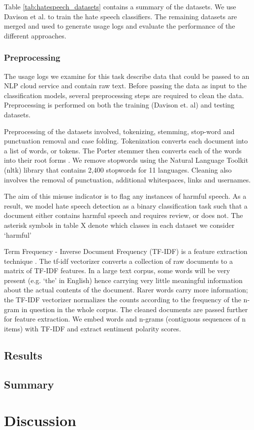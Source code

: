 \documentclass[a4paper,12pt]{report}
\begin{document}
	Table \ref{tab:hatespeech_datasets} contains a summary of the datasets. We use Davison et al. to train the hate speech classifiers. The remaining datasets are merged and used to generate usage logs and evaluate the performance of the different approaches.
	
	\subsection{Preprocessing}
	The usage logs we examine for this task describe data that could be passed to an NLP cloud service and contain raw text. Before passing the data as input to the classification models, several preprocessing steps are required to clean the data. Preprocessing is performed on both the training (Davison et. al) and testing datasets.
	
	Preprocessing of the datasets involved, tokenizing, stemming, stop-word and punctuation removal and case folding. Tokenization converts each document into a list of words, or tokens. The Porter stemmer then converts each of the words into their root forms \cite{porter1997readings}. We remove stopwords using the Natural Language Toolkit (nltk) library that contains 2,400 stopwords for 11 languages. Cleaning also involves the removal of punctuation, additional whitespaces, links and usernames.
	
	The aim of this misuse indicator is to flag any instances of harmful speech. As a result, we model hate speech detection as a binary classification task such that a document either contains harmful speech and requires review, or does not. The asterisk symbols in table X denote which classes in each dataset we consider `harmful’
	
	Term Frequency - Inverse Document Frequency (TF-IDF) is a feature extraction technique \cite{ramos2003using}. The tf-idf vectorizer converts a collection of raw documents to a matrix of TF-IDF features. In a large text corpus, some words will be very present (e.g. `the’ in English) hence carrying very little meaningful information about the actual contents of the document. Rarer words carry more information; the TF-IDF vectorizer normalizes the counts according to the frequency of the n-gram in question in the whole corpus. The cleaned documents are passed further for feature extraction. We embed words and n-grams (contiguous sequences of n items) with TF-IDF and extract sentiment polarity scores.
	
	\section{Results}
	
	\section{Summary}
	
	\chapter{Discussion}
	
	
	\appendix
	\singlespacing
	
	 
	 
	
\end{document}
